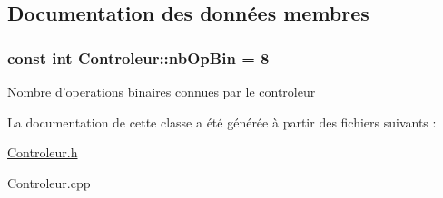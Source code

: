 \subsection{Documentation des données membres}
\hypertarget{class_controleur_bf929a8bcaec5e62b982c59d0a7f6166}{
\subsubsection[{nbOpBin}]{\setlength{\rightskip}{0pt plus 5cm}const int {\bf Controleur::nbOpBin} = 8}}
\label{class_controleur_bf929a8bcaec5e62b982c59d0a7f6166}


Nombre d'operations binaires connues par le controleur 

La documentation de cette classe a été générée à partir des fichiers suivants :\begin{CompactItemize}
\item 
\hyperlink{_controleur_8h}{Controleur.h}\item 
Controleur.cpp\end{CompactItemize}
